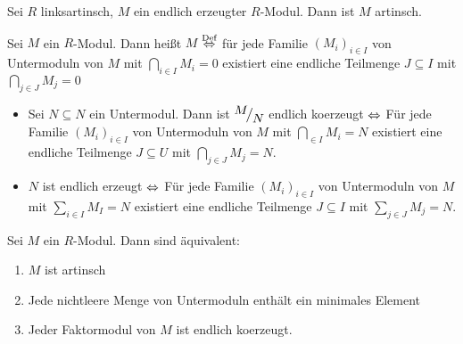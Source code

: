 \begin{fo}\label{3.19}
	Sei $R$ linksartinsch, $M$ ein endlich erzeugter $R$-Modul. Dann ist $M$ artinsch.
\end{fo}
\begin{df}\label{3.20}
	Sei $M$ ein $R$-Modul. Dann heißt $M$  $\overset{\text{Def}}{\Leftrightarrow} $ für jede Familie $(M_i)_{i\in I}$ von Untermoduln von $M$ mit $\bigcap_{i\in I} M_i = 0$ existiert eine endliche Teilmenge $J\subseteq I$ mit $\bigcap_{j\in J} M_j = 0$
\end{df}
\begin{anm}
	\begin{itemize}
		\item Sei $N\subseteq N$ ein Untermodul. Dann ist $\QR{M}{N}$ endlich koerzeugt $\Leftrightarrow $ Für jede Familie $(M_i)_{i\in I}$ von Untermoduln von $M$ mit $\bigcap_{\in I} M_i = N$ existiert eine endliche Teilmenge $J \subseteq U$ mit $\bigcap_{j\in J} M_j = N$.
		\item $N$ ist endlich erzeugt $\Leftrightarrow$ Für jede Familie $(M_i)_{i\in I}$ von Untermoduln von $M$ mit $\sum_{i\in I} M_I = N$ existiert eine endliche Teilmenge $J\subseteq I$ mit $\sum_{j\in J} M_j = N$.
	\end{itemize}
\end{anm}
\begin{sa}\label{3.21}
	Sei $M$ ein $R$-Modul. Dann sind äquivalent:
	\begin{enumerate}[label= \alph*)]
		\item $M$ ist artinsch
		\item Jede nichtleere Menge von Untermoduln enthält ein minimales Element
		\item Jeder Faktormodul von $M$ ist endlich koerzeugt.
	\end{enumerate}
\end{sa}

